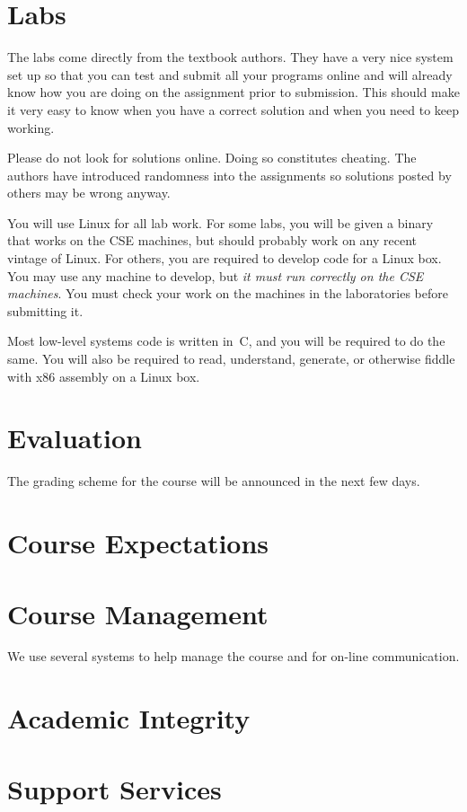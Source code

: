 \documentclass[11pt]{article}
\begin{document}
\section{Labs}

The labs come directly from the textbook authors.
They have a very nice system set up so that you can test and submit
all your programs online and will
already know how you are doing on the assignment prior to submission.
This should make it very easy to know when you have a correct solution
and when you need to keep working.

Please do not look for solutions online.
Doing so constitutes cheating.
The authors have introduced randomness into the assignments
so solutions posted by others may be wrong anyway.

You will use Linux for all lab work.
For some labs, you will be given a binary
that works on the CSE machines,
but should probably work on any recent vintage of Linux.
For others, you are required to develop code for a Linux box.
You may use any machine to develop,
but \emph{it must run correctly on the CSE machines}.
You must check your work on the machines in the laboratories
before submitting it.

Most low-level systems code is written in~C,
and you will be required to do the same.
You will also be required to read, understand, generate,
or otherwise fiddle with x86 assembly on a Linux box.

\section{Evaluation}

The grading scheme for the course will be announced in the next few days.

\section{Course Expectations}



\section{Course Management}

We use several systems to help manage the course
and for on-line communication.





\section{Academic Integrity}



\section{Support Services}



\printbibliography{}

\lastupdated
\end{document}
